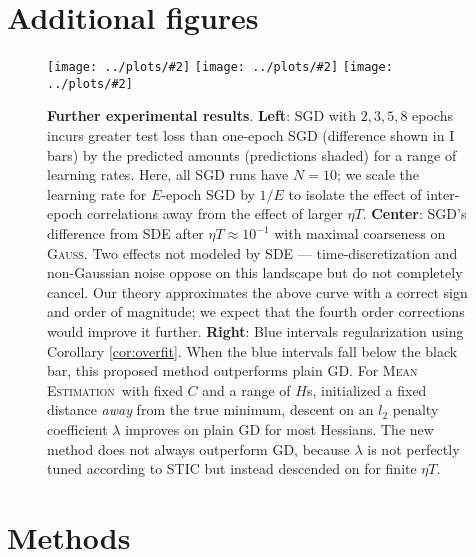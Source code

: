 \documentclass[openany, notitlepage, justified]{tufte-book}
\theoremstyle{plain}
\theoremstyle{definition}
\newcommand{\pmoo}[2]{\texttt{[image: ../plots/\#2]}}
\newcommand{\Gauss}{\textsc{Gauss}}
\newcommand{\MeanEstimation}{\textsc{Mean Estimation}}
\begin{document}
    \section{Additional figures}                                 \label{appendix:marginfigures}
        \begin{figure}
            \centering
            \centering
            \pmoo{3.5cm}{multi-fashion-logistic-0}
            \pmoo{3.5cm}{vs-sde}
            \pmoo{3.5cm}{tak-reg}
            \caption{
                \textbf{Further experimental results}.
                \textbf{Left}: SGD with $2, 3, 5, 8$ epochs incurs greater test
                loss than one-epoch SGD (difference shown in I bars) by the
                predicted amounts (predictions shaded) for a range of learning
                rates.  Here, all SGD runs have $N=10$; we scale the learning
                rate for $E$-epoch SGD by $1/E$ to isolate the effect of
                inter-epoch correlations away from the effect of larger $\eta
                T$.
                \textbf{Center}: SGD's difference from SDE after $\eta T
                \approx 10^{-1}$ with maximal coarseness on \Gauss.  Two
                effects not modeled by SDE --- time-discretization and
                non-Gaussian noise oppose on this landscape but do not
                completely cancel.  Our theory approximates the above curve
                with a correct sign and order of magnitude; we expect that the
                fourth order corrections would improve it further.
                \textbf{Right}: Blue intervals regularization using Corollary
                \ref{cor:overfit}.  When the blue intervals fall below the
                black bar, this proposed method outperforms plain GD.  For
                \MeanEstimation\ with fixed $C$ and a range of $H$s, initialized
                a fixed distance \emph{away} from the true minimum, descent on
                an $l_2$ penalty coefficient $\lambda$ improves on plain GD for
                most Hessians.  The new method does not always outperform GD,
                because $\lambda$ is not perfectly tuned according to STIC but
                instead descended on for finite $\eta T$.
            }
            \label{fig:takreg}
        \end{figure}

    \section{Methods}\label{appendix:experiments}
\end{document}

